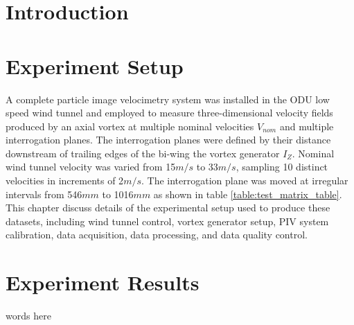\documentclass[12pt]{report}
\begin{document}
\beforepreface




\afterpreface

\chapter{Introduction}




\chapter{Experiment Setup}
A complete particle image velocimetry system was installed in the ODU low speed 
wind tunnel and employed to measure three-dimensional velocity fields produced 
by an axial vortex at multiple nominal velocities $V_{nom}$ and multiple 
interrogation planes. The interrogation planes were defined by their 
distance downstream of trailing edges of the bi-wing the vortex generator 
$I_Z$. Nominal wind tunnel velocity was varied from 15$m/s$ to 33$m/s$, 
sampling 10 distinct velocities in increments of 2$m/s$. The interrogation 
plane was moved at irregular intervals from 546$mm$ to 1016$mm$ as shown in 
table \ref{table:test_matrix_table}. This chapter discuss details of the 
experimental setup used to produce these datasets, including wind tunnel 
control, vortex generator setup, PIV system calibration, data acquisition, data 
processing, and data quality control.










\chapter{Experiment Results}
words here


\end{document}
